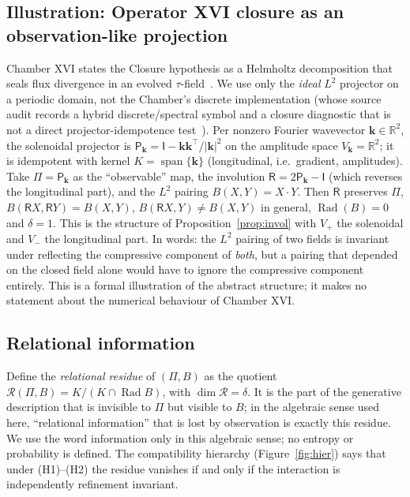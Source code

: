 \documentclass[11pt,a4paper]{article}
\newcommand{\RR}{\mathbb{R}}
\newcommand{\Rad}{\operatorname{Rad}}
\newcommand{\spn}{\operatorname{span}}
\newcommand{\defic}{\delta}
\theoremstyle{plain}
\theoremstyle{definition}
\begin{document}
\subsection{Illustration: Operator XVI closure as an observation-like projection}\label{sec:closure}
Chamber XVI states the Closure hypothesis as a Helmholtz decomposition that seals flux divergence in an evolved $\tau$-field~\cite{G7}. We use only the \emph{ideal} $L^2$ projector on a periodic domain, not the Chamber's discrete implementation (whose source audit records a hybrid discrete/spectral symbol and a closure diagnostic that is not a direct projector-idempotence test~\cite{G5}).
Per nonzero Fourier wavevector $\mathbf k\in\RR^2$, the solenoidal projector is $\mathsf P_{\mathbf k}=\mathsf I-\mathbf k\mathbf k^{\!\top}/|\mathbf k|^2$ on the amplitude space $V_{\mathbf k}=\RR^2$; it is idempotent with kernel $K=\spn\{\mathbf k\}$ (longitudinal, i.e.\ gradient, amplitudes). Take $\Pi=\mathsf P_{\mathbf k}$ as the ``observable'' map, the involution $\mathsf R=2\mathsf P_{\mathbf k}-\mathsf I$ (which reverses the longitudinal part), and the $L^2$ pairing $B(X,Y)=X\cdot Y$. Then $\mathsf R$ preserves $\Pi$, $B(\mathsf RX,\mathsf RY)=B(X,Y)$, $B(\mathsf RX,Y)\ne B(X,Y)$ in general, $\Rad(B)=0$ and $\defic=1$.
This is the structure of Proposition~\ref{prop:invol} with $V_+$ the solenoidal and $V_-$ the longitudinal part. In words: the $L^2$ pairing of two fields is invariant under reflecting the compressive component of \emph{both}, but a pairing that depended on the closed field alone would have to ignore the compressive component entirely. This is a formal illustration of the abstract structure; it makes no statement about the numerical behaviour of Chamber XVI.

\subsection{Relational information}
Define the \emph{relational residue} of $(\Pi,B)$ as the quotient $\mathcal R(\Pi,B)=K/(K\cap\Rad B)$, with $\dim\mathcal R=\defic$. It is the part of the generative description that is invisible to $\Pi$ but visible to $B$; in the algebraic sense used here, ``relational information'' that is lost by observation is exactly this residue. We use the word information only in this algebraic sense; no entropy or probability is defined. The compatibility hierarchy (Figure~\ref{fig:hier}) says that under (H1)--(H2) the residue vanishes if and only if the interaction is independently refinement invariant.
\end{document}
